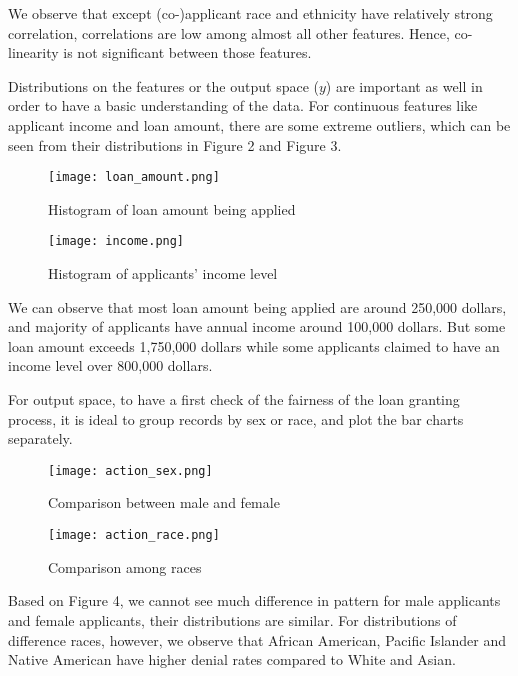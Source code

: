 \documentclass[letterpaper, 10 pt, conference]{ieeeconf}  %
\begin{document}
We observe that except (co-)applicant race and ethnicity have relatively strong correlation, correlations are low among almost all other features. Hence, co-linearity is not significant between those features.

Distributions on the features or the output space ($y$) are important as well in order to have a basic understanding of the data. For continuous features like applicant income and loan amount, there are some extreme outliers, which can be seen from their distributions in Figure 2 and Figure 3. 

\begin{figure}[H]
    \centering
    \texttt{[image: loan\_amount.png]}
    \caption{Histogram of loan amount being applied}
\end{figure}

\begin{figure}[H]
    \centering
    \texttt{[image: income.png]}
    \caption{Histogram of applicants' income level}
\end{figure}

We can observe that most loan amount being applied are around 250,000 dollars, and majority of applicants have annual income around 100,000 dollars. But some loan amount exceeds 1,750,000 dollars while some applicants claimed to have an income level over 800,000 dollars.

For output space, to have a first check of the fairness of the loan granting process, it is ideal to group records by sex or race, and plot the bar charts separately.

\begin{figure}[H]
    \centering
    \texttt{[image: action\_sex.png]}
    \caption{Comparison between male and female}
\end{figure}

\begin{figure}[H]
    \centering
    \texttt{[image: action\_race.png]}
    \caption{Comparison among races}
\end{figure}


Based on Figure 4, we cannot see much difference in pattern for male applicants and female applicants, their distributions are similar. For distributions of difference races, however, we observe that African American, Pacific Islander and Native American have higher denial rates compared to White and Asian. 
\end{document}
